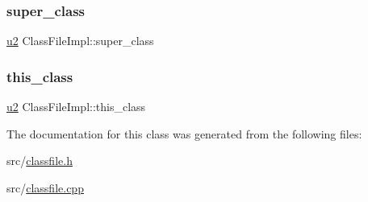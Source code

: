 \subsubsection{\texorpdfstring{super\+\_\+class}{super\_class}}
{\footnotesize\ttfamily \hyperlink{types_8h_ae676e9207f57fb921dca7366b2f59c53}{u2} Class\+File\+Impl\+::super\+\_\+class}

\mbox{\label{classClassFileImpl_a63d984dbdc45e796e6599e2c0b982f36}} 
\subsubsection{\texorpdfstring{this\+\_\+class}{this\_class}}
{\footnotesize\ttfamily \hyperlink{types_8h_ae676e9207f57fb921dca7366b2f59c53}{u2} Class\+File\+Impl\+::this\+\_\+class}



The documentation for this class was generated from the following files\+:\begin{DoxyCompactItemize}
\item 
src/\hyperlink{classfile_8h}{classfile.\+h}\item 
src/\hyperlink{classfile_8cpp}{classfile.\+cpp}\end{DoxyCompactItemize}
